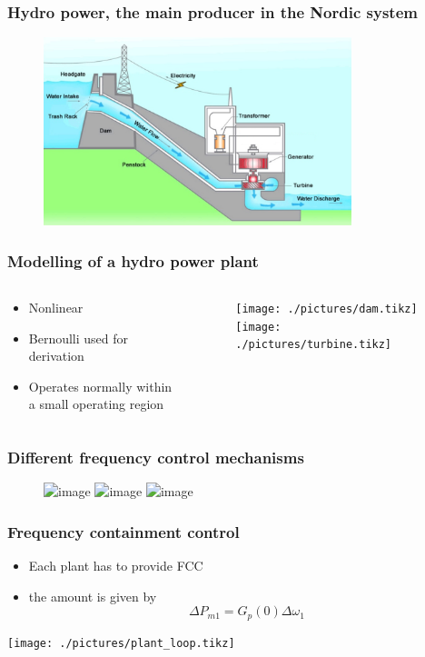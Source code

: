 \begin{frame}
	\frametitle{Hydro power, the main producer in the Nordic system}
			\begin{figure}
				\includegraphics[width=0.8\textwidth]{./pictures/power_plant.png}
		\end{figure}
\end{frame}
\begin{frame}
	\frametitle{Modelling of a hydro power plant}
	\begin{columns}
		\begin{column}{0.3\textwidth}
			\begin{itemize}
				\item Nonlinear
				\item Bernoulli used for derivation
				\item Operates normally within a small operating region
			\end{itemize}
		\end{column}
		\begin{column}{0.7\textwidth}
	\begin{figure}
		\centering
		\texttt{[image: ./pictures/dam.tikz]}
		\texttt{[image: ./pictures/turbine.tikz]}
	\end{figure}
	\end{column}
\end{columns}
\end{frame}
\begin{frame}
	\frametitle{Different frequency control mechanisms}
			\begin{figure}
				\includegraphics<1>[width=0.8\textwidth]{./pictures/balancing.png}
				\includegraphics<2>[width=0.8\textwidth]{./pictures/primary.png}
				\includegraphics<3>[width=0.8\textwidth]{./pictures/fcc.png}
		\end{figure}
\end{frame}
\begin{frame}
	\frametitle{Frequency containment control}
	\begin{itemize}
			\item Each plant has to provide FCC
			\item the amount is given by
				\begin{equation}
						\Delta P_{m1} = G_p(0)\Delta\omega_1
				\end{equation}

	\end{itemize}
		\texttt{[image: ./pictures/plant\_loop.tikz]}
\end{frame}
